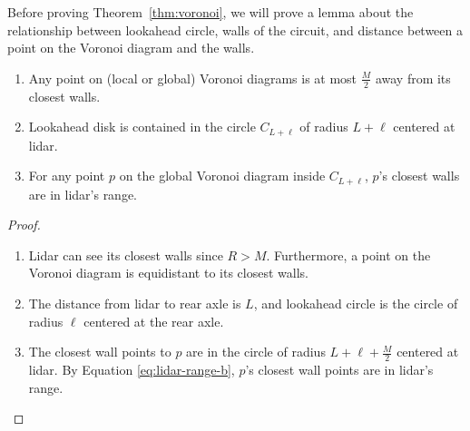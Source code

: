Before proving Theorem~\ref{thm:voronoi}, we will prove a lemma about the relationship between lookahead circle, walls of the circuit, and distance between a point on the Voronoi diagram and the walls.

\begin{lemma}
\begin{enumerate}
\item Any point on (local or global) Voronoi diagrams is at most $\frac{M}{2}$ away from its closest walls.
\item Lookahead disk is contained in the circle $C_{L+\ell}$ of radius $L+\ell$ centered at lidar.
\item For any point $p$ on the global Voronoi diagram inside $C_{L+\ell}$, $p$'s closest walls are in lidar's range.
\end{enumerate}
\end{lemma}
\begin{proof}
\begin{enumerate}
    \item 
    Lidar can see its closest walls since $R>M$. Furthermore, a point on the Voronoi diagram is equidistant to its closest walls.
    \item
    The distance from lidar to rear axle is $L$, and lookahead circle is the circle of radius $\ell$ centered at the rear axle.
    \item
    The closest wall points to $p$ are in the circle of radius $L+\ell+\frac{M}{2}$ centered at lidar. By Equation \ref{eq:lidar-range-b}, $p$'s closest wall points are in lidar's range.
\end{enumerate}
\end{proof}


